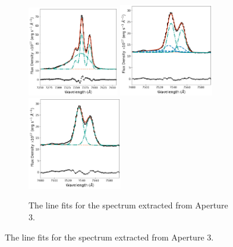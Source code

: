 \begin{figure}
\begin{subfigure}[t]{0.9\linewidth}
        \hspace{1.42cm}
        \includegraphics[width=0.435\textwidth]{figures/muse_f13451_1232/line_fits/ap3_halpha_no_nuclear_model.png}
        \vfill
        \includegraphics[width=0.45\textwidth]{figures/muse_f13451_1232/line_fits/ap3_sii.png}
        \hspace{1.3cm}
        \includegraphics[width=0.45\textwidth]{figures/muse_f13451_1232/line_fits/ap3_sii_no_nuclear_model.png}
        \label{fig: muse_f13451_1232: analysis_and_results: extended_emission: ap3_line_fits}
        \caption{The line fits for the spectrum extracted from Aperture 3.}
    \end{subfigure}
\end{figure}
